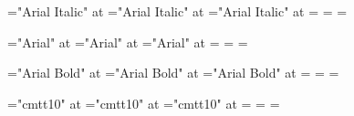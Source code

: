 \def\hugeti   {\font\zfontz="Arial Italic" at \hugefont   \zfontz}
\def\largeti  {\font\zfontz="Arial Italic" at \largefont  \zfontz}
\def\normalti {\font\zfontz="Arial Italic" at \normalfont \zfontz}
\def\smallti  {\font\zfontz="Arial Italic" at \smallfont  \zfontz}
\def\tinyti   {\font\zfontz="Arial Italic" at \tinyfont   \zfontz}

\font\1="Arial Italic" at \largefont
\font\2="Arial Italic" at \normalfont
\font\3="Arial Italic" at \smallfont
{}=\1 =\2 =\3

\def\hugesl   {\font\zfontz="Arial" at \hugefont   \zfontz}
\def\largesl  {\font\zfontz="Arial" at \largefont  \zfontz}
\def\normalsl {\font\zfontz="Arial" at \normalfont \zfontz}
\def\smallsl  {\font\zfontz="Arial" at \smallfont  \zfontz}
\def\tinysl   {\font\zfontz="Arial" at \tinyfont   \zfontz}

\font\1="Arial" at \largefont
\font\2="Arial" at \normalfont
\font\3="Arial" at \smallfont
{}=\1 =\2 =\3

\def\hugebx   {\font\zfontz="Arial Bold" at \hugefont   \zfontz}
\def\largebx  {\font\zfontz="Arial Bold" at \largefont  \zfontz}
\def\normalbx {\font\zfontz="Arial Bold" at \normalfont \zfontz}
\def\smallbx  {\font\zfontz="Arial Bold" at \smallfont  \zfontz}
\def\tinybx   {\font\zfontz="Arial Bold" at \tinyfont   \zfontz}

\font\1="Arial Bold" at \largefont
\font\2="Arial Bold" at \normalfont
\font\3="Arial Bold" at \smallfont
{}=\1 =\2 =\3

\def\hugett   {\font\zfontz="cmtt10" at \hugefont   \zfontz}
\def\largett  {\font\zfontz="cmtt10" at \largefont  \zfontz}
\def\normaltt {\font\zfontz="cmtt10" at \normalfont \zfontz}
\def\smalltt  {\font\zfontz="cmtt10" at \smallfont  \zfontz}
\def\tinytt   {\font\zfontz="cmtt10" at \tinyfont   \zfontz}

\font\1="cmtt10" at \largefont
\font\2="cmtt10" at \normalfont
\font\3="cmtt10" at \smallfont
{}=\1 =\2 =\3

\def\hugebxit   {\font\zfontz="Arial Bold Italic" at \hugefont   \zfontz}
\def\largebxit  {\font\zfontz="Arial Bold Italic" at \largefont  \zfontz}
\def\normalbxit {\font\zfontz="Arial Bold Italic" at \normalfont \zfontz}
\def\smallbxit  {\font\zfontz="Arial Bold Italic" at \smallfont  \zfontz}
\def\tinybxit   {\font\zfontz="Arial Bold Italic" at \tinyfont   \zfontz}
